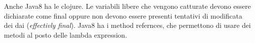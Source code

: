 
Anche Java8 ha le clojure. Le variabili libere che vengono catturate devono essere dichiarate come final oppure non devono essere presenti tentativi di modificata dei dai (\textit{effectivly final}).
Java8 ha i method refernces, che permettono di usare dei metodi al posto delle lambda expression.

